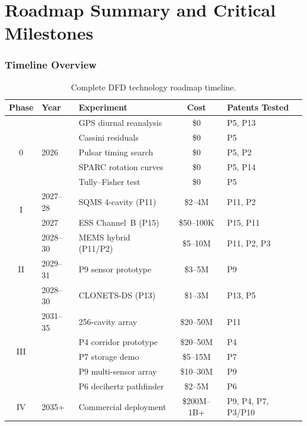 \documentclass[11pt]{article}
\begin{document}
\part{Roadmap Summary and Critical Milestones}
\label{part:milestones}

\section{Timeline Overview}
\label{sec:timeline}

\begin{table}[H]
\centering
\caption{Complete DFD technology roadmap timeline.}
\label{tab:timeline}
\small
\begin{tabular}{@{}clp{5cm}cp{3cm}@{}}
\toprule
\textbf{Phase} & \textbf{Year} & \textbf{Experiment} & \textbf{Cost} &
  \textbf{Patents Tested} \\
\midrule
\multirow{5}{*}{0} & \multirow{5}{*}{2026} & GPS diurnal reanalysis &
  \$0 & P5, P13 \\
  & & Cassini residuals & \$0 & P5 \\
  & & Pulsar timing search & \$0 & P5, P2 \\
  & & SPARC rotation curves & \$0 & P5, P14 \\
  & & Tully--Fisher test & \$0 & P5 \\
\midrule
\multirow{2}{*}{I} & 2027--28 & SQMS 4-cavity (P11) & \$2--4M &
  P11, P2 \\
  & 2027 & ESS Channel~B (P15) & \$50--100K & P15, P11 \\
\midrule
\multirow{3}{*}{II} & 2028--30 & MEMS hybrid (P11/P2) & \$5--10M &
  P11, P2, P3 \\
  & 2029--31 & P9 sensor prototype & \$3--5M & P9 \\
  & 2028--30 & CLONETS-DS (P13) & \$1--3M & P13, P5 \\
\midrule
\multirow{5}{*}{III} & 2031--35 & 256-cavity array & \$20--50M &
  P11 \\
  & & P4 corridor prototype & \$20--50M & P4 \\
  & & P7 storage demo & \$5--15M & P7 \\
  & & P9 multi-sensor array & \$10--30M & P9 \\
  & & P6 decihertz pathfinder & \$2--5M & P6 \\
\midrule
IV & 2035+ & Commercial deployment & \$200M--1B+ &
  P9, P4, P7, P3/P10 \\
\bottomrule
\end{tabular}
\end{table}
\end{document}
